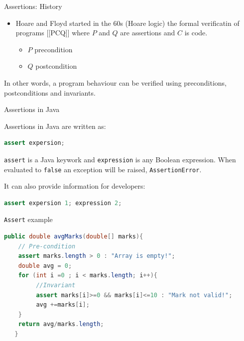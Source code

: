\documentclass[11pt, xcolor=svgnames]{beamer}
\begin{document}

\begin{frame}{Assertions: History}

\begin{itemize}
  \item Hoare and Floyd started in the 60s (Hoare logic) the formal verificatin of programs 
  [[{P}C{Q}]]
	where $P$ and $Q$ are assertions and $C$ is code.
	\begin{itemize}
	\item $P$ precondition 
	\item $Q$ postcondition
	\end{itemize}
\end{itemize}

In other words, a program behaviour can be verified using preconditions, postconditions and invariants.


\end{frame}


\begin{frame}[fragile]{Assertions in Java}

Assertions in Java are written as:

\begin{lstlisting}[language=JAVA,basicstyle=\small]
assert expersion;
\end{lstlisting}

\texttt{assert} is a Java keywork and \texttt{expression} is any Boolean expression. When evaluated to \texttt{false} an exception will be raised, \texttt{AssertionError}. 

It can also provide information for developers:

\begin{lstlisting}[language=JAVA,basicstyle=\small]
assert expersion 1; expression 2;
\end{lstlisting}

\end{frame}


\begin{frame}[fragile]{\texttt{Assert} example}

\begin{lstlisting}[language=JAVA,basicstyle=\scriptsize]
  public double avgMarks(double[] marks){
 	// Pre-condition
	assert marks.length > 0 : "Array is empty!";
   	double avg = 0;
   	for (int i =0 ; i < marks.length; i++){
	     //Invariant	
   	     assert marks[i]>=0 && marks[i]<=10 : "Mark not valid!";
   	     avg +=marks[i];
   	}
   	return avg/marks.length;
   }
\end{lstlisting}

\end{frame}
\end{document}
